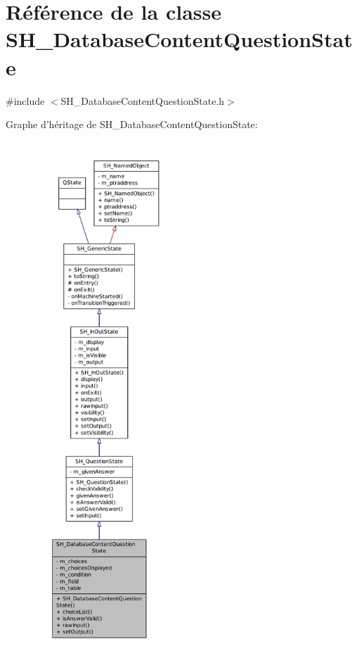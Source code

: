 \hypertarget{classSH__DatabaseContentQuestionState}{\section{Référence de la classe S\-H\-\_\-\-Database\-Content\-Question\-State}
\label{classSH__DatabaseContentQuestionState}
}


{\ttfamily \#include $<$S\-H\-\_\-\-Database\-Content\-Question\-State.\-h$>$}



Graphe d'héritage de S\-H\-\_\-\-Database\-Content\-Question\-State\-:\nopagebreak
\begin{figure}[H]
\begin{center}
\leavevmode
\includegraphics[height=550pt]{classSH__DatabaseContentQuestionState__inherit__graph}
\end{center}
\end{figure}


